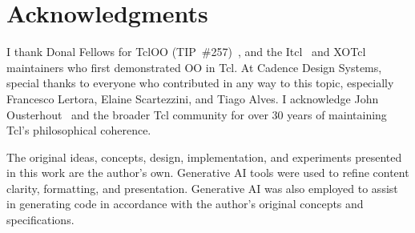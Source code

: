 \section*{Acknowledgments}

I thank Donal Fellows for TclOO (TIP~\#257)~\cite{fellows2006}, and the
Itcl~\cite{dejong,tclwiki-itcl} and XOTcl~\cite{neumann2000} maintainers who first
demonstrated OO in Tcl. At Cadence Design Systems, special thanks to everyone who
contributed in any way to this topic, especially Francesco Lertora, Elaine Scartezzini,
and Tiago Alves. I acknowledge John Ousterhout~\cite{ousterhout1994} and the broader
Tcl community for over 30 years of maintaining Tcl's philosophical coherence.

The original ideas, concepts, design, implementation, and experiments presented in this
work are the author's own. Generative AI tools were used to refine
content clarity, formatting, and presentation. Generative AI was also employed to assist
in generating code in accordance with the author's original concepts and specifications.
